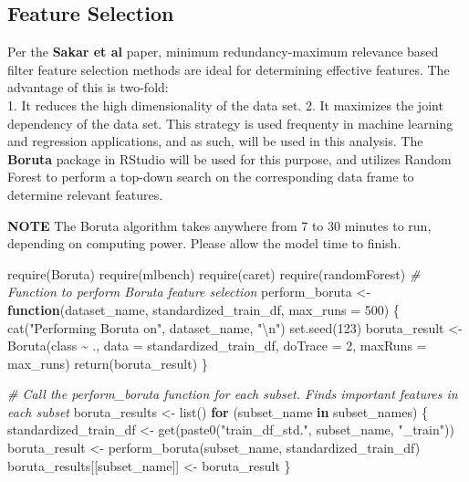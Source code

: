 \documentclass[
]{article}
\newenvironment{Shaded}{\begin{snugshade}}{\end{snugshade}}
\newcommand{\AttributeTok}[1]{\textcolor[rgb]{0.77,0.63,0.00}{#1}}
\newcommand{\CommentTok}[1]{\textcolor[rgb]{0.56,0.35,0.01}{\textit{#1}}}
\newcommand{\ControlFlowTok}[1]{\textcolor[rgb]{0.13,0.29,0.53}{\textbf{#1}}}
\newcommand{\DecValTok}[1]{\textcolor[rgb]{0.00,0.00,0.81}{#1}}
\newcommand{\FunctionTok}[1]{\textcolor[rgb]{0.00,0.00,0.00}{#1}}
\newcommand{\NormalTok}[1]{#1}
\newcommand{\OtherTok}[1]{\textcolor[rgb]{0.56,0.35,0.01}{#1}}
\newcommand{\SpecialCharTok}[1]{\textcolor[rgb]{0.00,0.00,0.00}{#1}}
\newcommand{\StringTok}[1]{\textcolor[rgb]{0.31,0.60,0.02}{#1}}
\begin{document}
\newpage

\hypertarget{feature-selection}{%
\subsection{Feature Selection}\label{feature-selection}}

Per the \textbf{Sakar et al} paper, minimum redundancy-maximum relevance based filter feature selection methods are ideal for determining effective features. The advantage of this is two-fold:\\
1. It reduces the high dimensionality of the data set.
2. It maximizes the joint dependency of the data set.
This strategy is used frequenty in machine learning and regression applications, and as such, will be used in this analysis. The \textbf{Boruta} package in RStudio will be used for this purpose, and utilizes Random Forest to perform a top-down search on the corresponding data frame to determine relevant features.

\textbf{NOTE}
The Boruta algorithm takes anywhere from 7 to 30 minutes to run, depending on computing power. Please allow the model time to finish.

\begin{Shaded}
\begin{Highlighting}[]
\FunctionTok{require}\NormalTok{(Boruta)}
\FunctionTok{require}\NormalTok{(mlbench)}
\FunctionTok{require}\NormalTok{(caret)}
\FunctionTok{require}\NormalTok{(randomForest)}
\CommentTok{\# Function to perform Boruta feature selection}
\NormalTok{perform\_boruta }\OtherTok{\textless{}{-}} \ControlFlowTok{function}\NormalTok{(dataset\_name, standardized\_train\_df, }\AttributeTok{max\_runs =} \DecValTok{500}\NormalTok{) \{}
  \FunctionTok{cat}\NormalTok{(}\StringTok{"Performing Boruta on"}\NormalTok{, dataset\_name, }\StringTok{"}\SpecialCharTok{\textbackslash{}n}\StringTok{"}\NormalTok{)}
  \FunctionTok{set.seed}\NormalTok{(}\DecValTok{123}\NormalTok{)}
\NormalTok{  boruta\_result }\OtherTok{\textless{}{-}} \FunctionTok{Boruta}\NormalTok{(class }\SpecialCharTok{\textasciitilde{}}\NormalTok{ ., }\AttributeTok{data =}\NormalTok{ standardized\_train\_df, }\AttributeTok{doTrace =} \DecValTok{2}\NormalTok{, }\AttributeTok{maxRuns =}\NormalTok{ max\_runs)}
  \FunctionTok{return}\NormalTok{(boruta\_result)}
\NormalTok{\}}

\CommentTok{\# Call the perform\_boruta function for each subset. Finds important features in each subset}
\NormalTok{boruta\_results }\OtherTok{\textless{}{-}} \FunctionTok{list}\NormalTok{()}
\ControlFlowTok{for}\NormalTok{ (subset\_name }\ControlFlowTok{in}\NormalTok{ subset\_names) \{}
\NormalTok{  standardized\_train\_df }\OtherTok{\textless{}{-}} \FunctionTok{get}\NormalTok{(}\FunctionTok{paste0}\NormalTok{(}\StringTok{"train\_df\_std."}\NormalTok{, subset\_name, }\StringTok{"\_train"}\NormalTok{))}
\NormalTok{  boruta\_result }\OtherTok{\textless{}{-}} \FunctionTok{perform\_boruta}\NormalTok{(subset\_name, standardized\_train\_df)}
\NormalTok{  boruta\_results[[subset\_name]] }\OtherTok{\textless{}{-}}\NormalTok{ boruta\_result}
\NormalTok{\}}
\end{Highlighting}
\end{Shaded}
\end{document}

